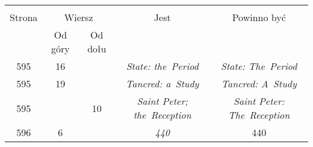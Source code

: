 \documentclass[a4paper,11pt]{article}
\begin{document}
\begin{center}
  \begin{tabular}{|c|c|c|c|c|}
    \hline
    & \multicolumn{2}{c|}{} & & \\
    Strona & \multicolumn{2}{c|}{Wiersz}& Jest
                              & Powinno być \\ \cline{2-3}
    & Od góry & Od dołu & & \\
    \hline
    595 & 16 & & \emph{State: the~Period} & \emph{State: The~Period} \\
    595 & 19 & & \emph{Tancred: a~Study} & \emph{Tancred: A~Study} \\
    595 & & 10 & \emph{Saint Peter; the~Reception}
           & \emph{Saint Peter: The~Reception} \\
    596 &  6 & & \emph{440} & 440 \\
    \hline
  \end{tabular}
\end{center}
\end{document}
